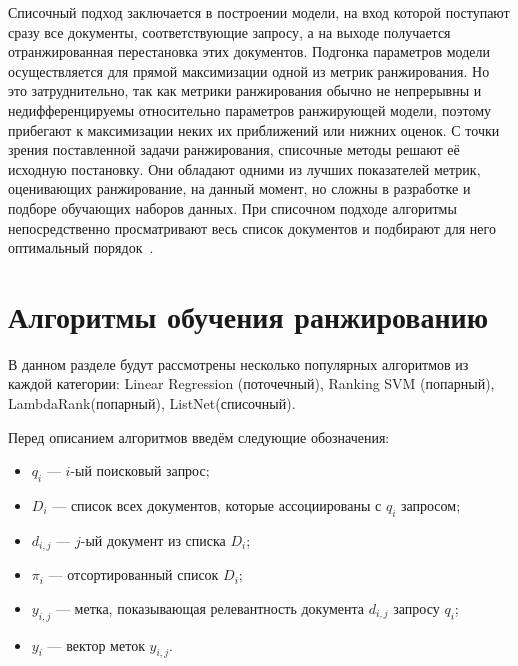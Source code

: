 Списочный подход заключается в построении модели, на вход которой поступают сразу все документы, соответствующие запросу, а на выходе получается отранжированная перестановка этих документов. Подгонка параметров модели осуществляется для прямой максимизации одной из  метрик ранжирования. Но это затруднительно, так как метрики ранжирования обычно не непрерывны и недифференцируемы относительно параметров ранжирующей модели, поэтому прибегают к максимизации неких их приближений или нижних оценок. С точки зрения поставленной задачи ранжирования, списочные методы  решают её исходную постановку. Они обладают одними из лучших показателей метрик, оценивающих ранжирование, на данный момент, но  сложны в разработке и подборе обучающих наборов данных. При списочном подходе алгоритмы непосредственно просматривают весь список документов и подбирают для него оптимальный порядок~\cite{ML_for_SE}.

\section{Алгоритмы обучения ранжированию}

В данном разделе будут рассмотрены несколько популярных алгоритмов из каждой категории: Linear Regression (поточечный), Ranking SVM (попарный), LambdaRank(попарный), ListNet(списочный). 

Перед описанием алгоритмов введём следующие обозначения:
\begin{itemize}[label=---]
	\item $q_{i}$ --- $i$-ый поисковый запрос;
	\item $D_{i}$ --- список всех документов, которые ассоциированы с $q_{i}$ запросом;
	\item $d_{i,j}$ --- $j$-ый документ из списка $D_{i}$;
	\item $\pi_{i}$ --- отсортированный список $D_{i}$;
	\item $y_{i,j}$ --- метка, показывающая релевантность документа $d_{i,j}$  запросу $q_{i}$;
	\item $y_{i}$ --- вектор меток $y_{i,j}$.
\end{itemize} 

